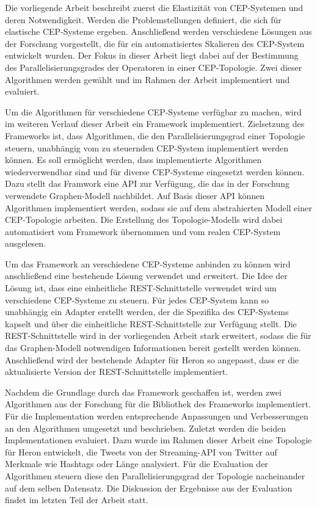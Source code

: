 Die vorliegende Arbeit beschreibt zuerst die Elastizität von CEP-Systemen und deren Notwendigkeit.
Werden die Problemstellungen definiert, die sich für elastische CEP-Systeme ergeben.
Anschließend werden verschiedene Lösungen aus der Forschung vorgestellt, die für ein automatisiertes Skalieren des CEP-System entwickelt wurden.
Der Fokus in dieser Arbeit liegt dabei auf der Bestimmung des Parallelisierungsgrades der Operatoren in einer CEP-Topologie.
Zwei dieser Algorithmen werden gewählt und im Rahmen der Arbeit implementiert und evaluiert.

Um die Algorithmen für verschiedene CEP-Systeme verfügbar zu machen, wird im weiteren Verlauf dieser Arbeit ein Framework implementiert.
Zielsetzung des Frameworks ist, dass Algorithmen, die den Parallelisierungsgrad einer Topologie steuern, unabhängig vom zu steuernden CEP-System implementiert werden können.
Es soll ermöglicht werden, dass implementierte Algorithmen wiederverwendbar sind und für diverse CEP-Systeme eingesetzt werden können.
Dazu stellt das Framwork eine API zur Verfügung, die das in der Forschung verwendete Graphen-Modell nachbildet.
Auf Basis dieser API können Algorithmen implementiert werden, sodass sie auf dem abstrahierten Modell einer CEP-Topologie arbeiten.
Die Erstellung des Topologie-Modells wird dabei automatisiert vom Framework übernommen und vom realen CEP-System ausgelesen.

Um das Framework an verschiedene CEP-Systeme anbinden zu können wird anschließend eine bestehende Lösung \cite{goggel_vergleich_2018} verwendet und erweitert.
Die Idee der Lösung ist, dass eine einheitliche REST-Schnittstelle verwendet wird um verschiedene CEP-Systeme zu steuern.
Für jedes CEP-System kann so unabhängig ein Adapter erstellt werden, der die Spezifika des CEP-Systems kapselt und über die einheitliche REST-Schnittstelle zur Verfügung stellt.
Die REST-Schnittstelle wird in der vorliegenden Arbeit stark erweitert, sodass die für das Graphen-Modell notwendigen Informationen bereit gestellt werden können.
Anschließend wird der bestehende Adapter für Heron so angepasst, dass er die aktualisierte Version der REST-Schnittstelle implementiert.

Nachdem die Grundlage durch das Framework geschaffen ist, werden zwei Algorithmen aus der Forschung für die Bibliothek des Frameworks implementiert.
Für die Implementation werden entsprechende Anpassungen und Verbesserungen an den Algorithmen umgesetzt und beschrieben.
Zuletzt werden die beiden Implementationen evaluiert.
Dazu wurde im Rahmen dieser Arbeit eine Topologie für Heron entwickelt, die Tweets von der Streaming-API von Twitter auf Merkmale wie Hashtags oder Länge analysiert.
Für die Evaluation der Algorithmen steuern diese den Parallelisierungsgrad der Topologie nacheinander auf dem selben Datensatz.
Die Diskussion der Ergebnisse aus der Evaluation findet im letzten Teil der Arbeit statt.